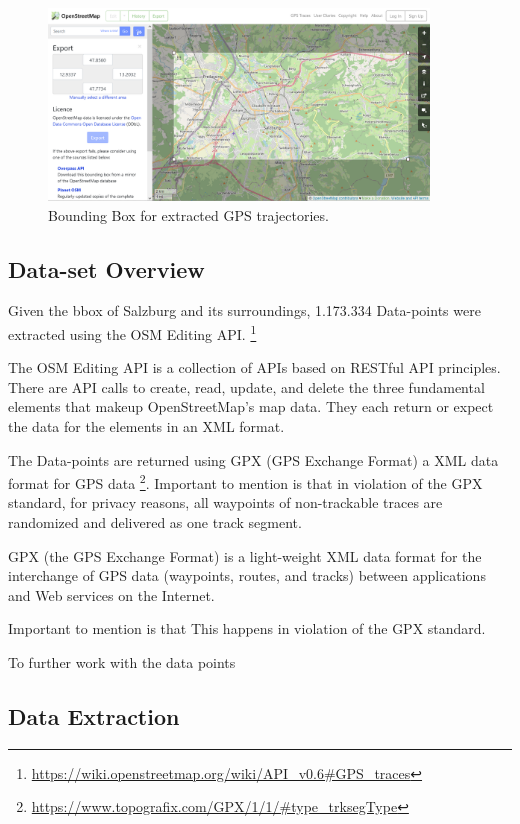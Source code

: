 \begin{figure}[t]
  \centering
  \includegraphics[width=0.9\textwidth]{images/BoundingBoxOSM.png}
  \caption{
  Bounding Box for extracted GPS trajectories.
  }
  \label{figure:BoundingBox}
\end{figure}


\subsection{Data-set Overview}

Given the bbox of Salzburg and its surroundings, 1.173.334 Data-points were extracted using the OSM Editing API. \footnote{\url{https://wiki.openstreetmap.org/wiki/API_v0.6#GPS_traces}}

The OSM Editing API is a collection of APIs based on RESTful API principles. There are API calls to create, read, update, and delete the three fundamental elements that makeup OpenStreetMap's map data. They each return or expect the data for the elements in an XML format.
\autocite[]{wiki:xxx}

The Data-points are returned using GPX (GPS Exchange Format) a XML data format for GPS data \footnote{\url{https://www.topografix.com/GPX/1/1/#type_trksegType}}. Important to mention is that in violation of the GPX standard, for privacy reasons, all waypoints of non-trackable traces are randomized and delivered as one track segment. 

GPX (the GPS Exchange Format) is a light-weight XML data format for the interchange of GPS data (waypoints, routes, and tracks) between applications and Web services on the Internet. 

Important to mention is that This happens in violation of the GPX standard. 

To further work with the data points 

\subsection{Data Extraction}

